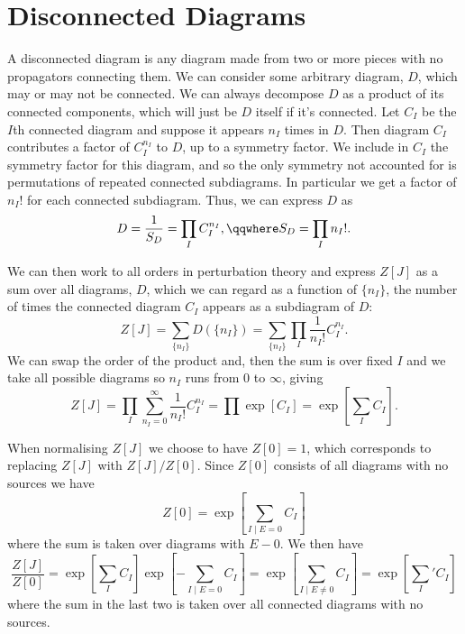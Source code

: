 \documentclass[fleqn]{NotesClass}
\begin{document}
    \section{Disconnected Diagrams}\label{sec:disconnected diagrams}
    A disconnected diagram is any diagram made from two or more pieces with no propagators connecting them.
    We can consider some arbitrary diagram, \(D\), which may or may not be connected.
    We can always decompose \(D\) as a product of its connected components, which will just be \(D\) itself if it's connected.
    Let \(C_I\) be the \(I\)th connected diagram and suppose it appears \(n_I\) times in \(D\).
    Then diagram \(C_I\) contributes a factor of \(C_I^{n_I}\) to \(D\), up to a symmetry factor.
    We include in \(C_I\) the symmetry factor for this diagram, and so the only symmetry not accounted for is permutations of repeated connected subdiagrams.
    In particular we get a factor of \(n_I!\) for each connected subdiagram.
    Thus, we can express \(D\) as
    \begin{equation}
        D = \frac{1}{S_D} = \prod_I C_I^{n_I}, \qqwhere S_D = \prod_I n_I!.
    \end{equation}
    
    We can then work to all orders in perturbation theory and express \(Z[J]\) as a sum over all diagrams, \(D\), which we can regard as a function of \(\{n_I\}\), the number of times the connected diagram \(C_I\) appears as a subdiagram of \(D\):
    \begin{equation}
        Z[J] = \sum_{\{n_I\}} D(\{n_I\}) = \sum_{\{n_I\}} \prod _I \frac{1}{n_I!} C_I^{n_I}.
    \end{equation}
    We can swap the order of the product and, then the sum is over fixed \(I\) and we take all possible diagrams so \(n_I\) runs from 0 to \(\infty\), giving
    \begin{equation}
        Z[J] = \prod_I \sum_{n_I = 0}^{\infty} \frac{1}{n_I!} C_I^{n_I} = \prod \exp[C_I] = \exp\left[ \sum_I C_I \right].
    \end{equation}
    
    When normalising \(Z[J]\) we choose to have \(Z[0] = 1\), which corresponds to replacing \(Z[J]\) with \(Z[J]/Z[0]\).
    Since \(Z[0]\) consists of all diagrams with no sources we have
    \begin{equation}
        Z[0] = \exp\left[ \sum_{I \mid E = 0} C_I \right]
    \end{equation}
    where the sum is taken over diagrams with \(E - 0\).
    We then have
    \begin{equation}
        \frac{Z[J]}{Z[0]} = \exp\left[ \sum_I C_I \right] \exp\left[ -\sum_{I \mid E = 0} C_I \right] = \exp\left[ \sum_{I \mid E \ne 0} C_I \right] = \exp\left[ {\sum_I}' C_I \right]
    \end{equation}
    where the sum in the last two is taken over all connected diagrams with no sources.
    
\end{document}

